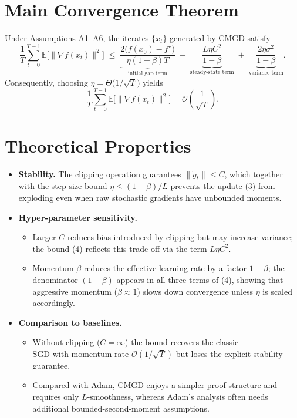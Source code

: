 \documentclass{article}
\newcommand{\E}{\mathbb{E}}
\begin{document}
\section*{Main Convergence Theorem}
\begin{theorem}\label{thm:main}
Under Assumptions A1–A6, the iterates $\{x_t\}$ generated by CMGD satisfy
\[
\frac{1}{T}\sum_{t=0}^{T-1}\E\!\bigl[\|\nabla f(x_t)\|^2\bigr]
\;\le\;
\underbrace{\frac{2\bigl(f(x_0)-f^\star\bigr)}{\eta(1-\beta)T}}_{\displaystyle\text{initial gap term}}
\;+\;
\underbrace{\frac{L\eta C^2}{1-\beta}}_{\displaystyle\text{steady‑state term}}
\;+\;
\underbrace{\frac{2\eta\sigma^2}{1-\beta}}_{\displaystyle\text{variance term}} .
\tag{4}
\]
Consequently, choosing $\eta = \Theta\!\bigl(1/\sqrt{T}\bigr)$ yields
\[
\frac{1}{T}\sum_{t=0}^{T-1}\E\!\bigl[\|\nabla f(x_t)\|^2\bigr]=\mathcal{O}\!\left(\frac{1}{\sqrt{T}}\right).
\]
\end{theorem}

\section*{Theoretical Properties}
\begin{itemize}
\item \textbf{Stability.} The clipping operation guarantees $\|\tilde g_t\|\le C$, which together with the step‑size bound $\eta\le (1-\beta)/L$ prevents the update (3) from exploding even when raw stochastic gradients have unbounded moments.
\item \textbf{Hyper‑parameter sensitivity.}
    \begin{itemize}
        \item Larger $C$ reduces bias introduced by clipping but may increase variance; the bound (4) reflects this trade‑off via the term $L\eta C^2$.
        \item Momentum $\beta$ reduces the effective learning rate by a factor $1-\beta$; the denominator $(1-\beta)$ appears in all three terms of (4), showing that aggressive momentum ($\beta\approx 1$) slows down convergence unless $\eta$ is scaled accordingly.
    \end{itemize}
\item \textbf{Comparison to baselines.}
    \begin{itemize}
        \item Without clipping ($C=\infty$) the bound recovers the classic SGD‑with‑momentum rate $\mathcal{O}(1/\sqrt{T})$ but loses the explicit stability guarantee.
        \item Compared with Adam, CMGD enjoys a simpler proof structure and requires only $L$‑smoothness, whereas Adam’s analysis often needs additional bounded‑second‑moment assumptions.
    \end{itemize}
\end{itemize}
\end{document}

